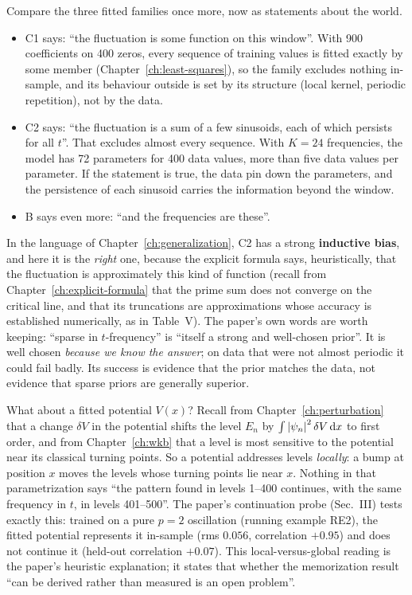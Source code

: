 Compare the three fitted families once more, now as statements about the world.
\begin{itemize}
\item C1 says: ``the fluctuation is some function on this window''. With 900 coefficients on 400 zeros, every sequence of training values is fitted exactly by some member (Chapter~\ref{ch:least-squares}), so the family excludes nothing in-sample, and its behaviour outside is set by its structure (local kernel, periodic repetition), not by the data.
\item C2 says: ``the fluctuation is a sum of a few sinusoids, each of which persists for all $t$''. That excludes almost every sequence. With $K=24$ frequencies, the model has 72 parameters for 400 data values, more than five data values per parameter. If the statement is true, the data pin down the parameters, and the persistence of each sinusoid carries the information beyond the window.
\item B says even more: ``and the frequencies are these''.
\end{itemize}
In the language of Chapter~\ref{ch:generalization}, C2 has a strong \textbf{inductive bias}, and here it is the \emph{right} one, because the explicit formula says, heuristically, that the fluctuation is approximately this kind of function (recall from Chapter~\ref{ch:explicit-formula} that the prime sum does not converge on the critical line, and that its truncations are approximations whose accuracy is established numerically, as in Table~V). The paper's own words are worth keeping: ``sparse in $t$-frequency'' is ``itself a strong and well-chosen prior''. It is well chosen \emph{because we know the answer}; on data that were not almost periodic it could fail badly. Its success is evidence that the prior matches the data, not evidence that sparse priors are generally superior.

What about a fitted potential $V(x)$? Recall from Chapter~\ref{ch:perturbation} that a change $\delta V$ in the potential shifts the level $E_n$ by $\int\left\lvert \psi_n\right\rvert^2\delta V\,\mathrm{d} x$ to first order, and from Chapter~\ref{ch:wkb} that a level is most sensitive to the potential near its classical turning points. So a potential addresses levels \emph{locally}: a bump at position $x$ moves the levels whose turning points lie near $x$. Nothing in that parametrization says ``the pattern found in levels 1--400 continues, with the same frequency in $t$, in levels 401--500''. The paper's continuation probe (Sec.~III) tests exactly this: trained on a pure $p=2$ oscillation (running example RE2), the fitted potential represents it in-sample (rms $0.056$, correlation $+0.95$) and does not continue it (held-out correlation $+0.07$). This local-versus-global reading is the paper's heuristic explanation; it states that whether the memorization result ``can be derived rather than measured is an open problem''.

